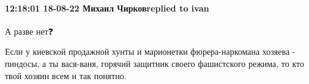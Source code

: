  
 
 
 
 

\paragraph{12:18:01 18-08-22 Михаил Чирковreplied to ivan}

А разве нет❓

Если у киевской продажной хунты и марионетки фюрера-наркомана хозяева -
пиндосы, а ты вася-ваня, горячий защитник своего фашистского режима, то кто
твой хозяин всем и так понятно.
